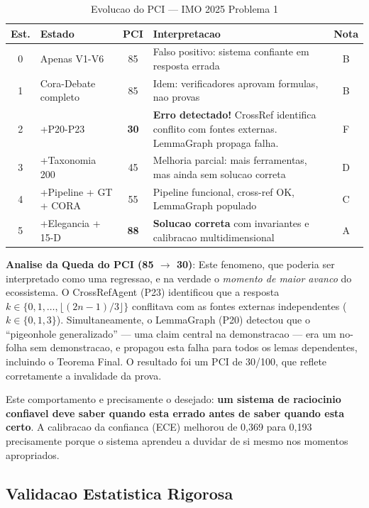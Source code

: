 \documentclass[5p]{elsarticle}
\begin{document}
\begin{table}[H]
  \centering
  \caption{Evolucao do PCI — IMO 2025 Problema 1}
  \label{tab:pcitrajectory}
  \small
  \begin{tabular}{clcp{4cm}c}
    \toprule
    \textbf{Est.} & \textbf{Estado} & \textbf{PCI} & \textbf{Interpretacao} & \textbf{Nota} \\
    \midrule
    0 & Apenas V1-V6 & 85 & Falso positivo: sistema confiante em resposta errada & B \\
    1 & Cora-Debate completo & 85 & Idem: verificadores aprovam formulas, nao provas & B \\
    \rowcolor{redbg}
    2 & +P20-P23 & \textbf{30} & \textbf{Erro detectado!} CrossRef identifica conflito com fontes externas. LemmaGraph propaga falha. & F \\
    3 & +Taxonomia 200 & 45 & Melhoria parcial: mais ferramentas, mas ainda sem solucao correta & D \\
    \rowcolor{yellowbg}
    4 & +Pipeline + GT + CORA & 55 & Pipeline funcional, cross-ref OK, LemmaGraph populado & C \\
    \rowcolor{greenbg}
    5 & +Elegancia + 15-D & \textbf{88} & \textbf{Solucao correta} com invariantes e calibracao multidimensional & A \\
    \bottomrule
  \end{tabular}
\end{table}

\textbf{Analise da Queda do PCI (85 $\to$ 30)}: Este fenomeno, que poderia
ser interpretado como uma regressao, e na verdade o \textit{momento de maior
avanco} do ecossistema. O CrossRefAgent (P23) identificou que a resposta
$k\in\{0,1,\dots,\lfloor(2n-1)/3\rfloor\}$ conflitava com as fontes externas
independentes ($k\in\{0,1,3\}$). Simultaneamente, o LemmaGraph (P20) detectou
que o ``pigeonhole generalizado'' --- uma claim central na demonstracao ---
era um no-folha sem demonstracao, e propagou esta falha para todos os lemas
dependentes, incluindo o Teorema Final. O resultado foi um PCI de 30/100, que
reflete corretamente a invalidade da prova.

Este comportamento e precisamente o desejado: \textbf{um sistema de raciocinio
confiavel deve saber quando esta errado antes de saber quando esta certo}. A
calibracao da confianca (ECE) melhorou de 0,369 para 0,193 precisamente porque
o sistema aprendeu a duvidar de si mesmo nos momentos apropriados.

\subsection{Validacao Estatistica Rigorosa}
\end{document}
